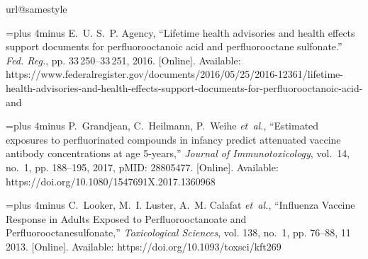 \documentclass[journal,onecolumn]{IEEEtran}
\begin{document}
%   
%   



\begin{thebibliography}{48}
\providecommand{\natexlab}[1]{#1}
\providecommand{\url}[1]{#1}
\csname url@samestyle\endcsname
\providecommand{\newblock}{\relax}
\providecommand{\bibinfo}[2]{#2}
\providecommand{\BIBentrySTDinterwordspacing}{\spaceskip=0pt\relax}
\providecommand{\BIBentryALTinterwordstretchfactor}{4}
\providecommand{\BIBentryALTinterwordspacing}{\spaceskip=\fontdimen2\font plus
\BIBentryALTinterwordstretchfactor\fontdimen3\font minus
  \fontdimen4\font\relax}
\providecommand{\BIBforeignlanguage}[2]{{%
\expandafter\ifx\csname l@#1\endcsname\relax
\typeout{** WARNING: IEEEtranN.bst: No hyphenation pattern has been}%
\typeout{** loaded for the language `#1'. Using the pattern for}%
\typeout{** the default language instead.}%
\else
\language=\csname l@#1\endcsname
\fi
#2}}
\providecommand{\BIBdecl}{\relax}
\BIBdecl

\BIBentryALTinterwordspacing
E.~U. S.~P. Agency, ``Lifetime health advisories and health effects support
  documents for perfluorooctanoic acid and perfluorooctane sulfonate.''
  \emph{Fed. Reg.}, pp. 33\,250--33\,251, 2016. [Online]. Available:
  \url{https://www.federalregister.gov/documents/2016/05/25/2016-12361/lifetime-health-advisories-and-health-effects-support-documents-for-perfluorooctanoic-acid-and}
\BIBentrySTDinterwordspacing

\BIBentryALTinterwordspacing
P.~Grandjean, C.~Heilmann, P.~Weihe \emph{et~al.}, ``Estimated exposures to
  perfluorinated compounds in infancy predict attenuated vaccine antibody
  concentrations at age 5-years,'' \emph{Journal of Immunotoxicology}, vol.~14,
  no.~1, pp. 188--195, 2017, pMID: 28805477. [Online]. Available:
  \url{https://doi.org/10.1080/1547691X.2017.1360968}
\BIBentrySTDinterwordspacing

\BIBentryALTinterwordspacing
C.~Looker, M.~I. Luster, A.~M. Calafat \emph{et~al.}, ``{Influenza Vaccine
  Response in Adults Exposed to Perfluorooctanoate and
  Perfluorooctanesulfonate},'' \emph{Toxicological Sciences}, vol. 138, no.~1,
  pp. 76--88, 11 2013. [Online]. Available:
  \url{https://doi.org/10.1093/toxsci/kft269}
\BIBentrySTDinterwordspacing


\end{thebibliography}
\end{document}
